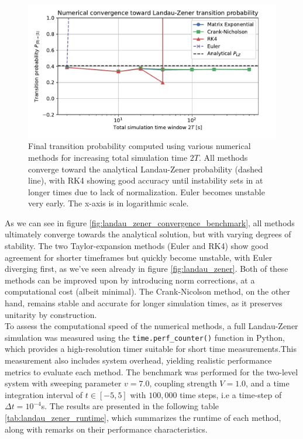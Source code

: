 \documentclass{subfiles}
\begin{document}
\begin{figure}[h!]
\centering
\includegraphics[width=1.0\textwidth]{figs/landau_zener_convergence_benchmark.pdf}
\caption{Final transition probability computed using various numerical methods for increasing total simulation time $
2T$. All methods converge toward the analytical Landau-Zener probability (dashed line), with RK4 showing good accuracy until instability sets in at longer times due to lack of normalization. Euler becomes unstable very early. The x-axis is in logarithmic scale.}
\end{figure}

As we can see in figure \eqref{fig:landau_zener_convergence_benchmark}, all methods ultimately converge towards the analytical solution, but with varying degrees of stability. The two Taylor-expansion methods (Euler and RK4) show good agreement for shorter timeframes but quickly become unstable, with Euler diverging first, as we've seen already in figure \eqref{fig:landau_zener}. Both of these methods can be improved upon by introducing norm corrections, at a computational cost (albeit minimal). The Crank-Nicolson method, on the other hand, remains stable and accurate for longer simulation times, as it preserves unitarity by construction. 
\\ 

To assess the computational speed of the numerical methods, a full Landau-Zener simulation was measured using the \texttt{time.perf\_counter()} function in Python, which provides a high-resolution timer suitable for short time measurements.This measurement also includes system overhead, yielding realistic performance metrics to evaluate each method. 
The benchmark was performed for the two-level system with sweeping parameter $v=7.0$, coupling strength $V=1.0$, and a time integration interval of $t \in [-5, 5]$ with $100{,}000$ time steps, i.e a time-step of $\Delta t = 10^{-4}$s. The results are presented in the following table \eqref{tab:landau_zener_runtime}, which summarizes the runtime of each method, along with remarks on their performance characteristics.
\end{document}
